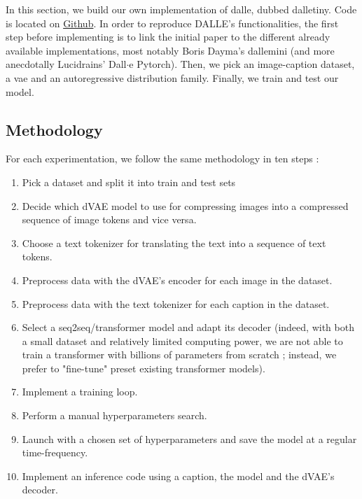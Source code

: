 \documentclass{article}
\begin{document}
\begin{multicols}{2}

In this section, we build our own implementation of \gls{dalle}, dubbed \gls{dalletiny}. Code is located on \href{https://github.com/cthiounn/dalle-tiny}{Github}. In order to reproduce DALLE's functionalities, the first step before implementing is to link the initial paper to the different already available implementations, most notably Boris Dayma's \gls{dallemini} (and more anecdotally Lucidrains' Dall$\cdot$e Pytorch). Then, we pick an image-caption dataset, a \gls{vae} and an autoregressive distribution family. Finally, we train and test our model.

\subsection{Methodology}

For each experimentation, we follow the same methodology in ten steps :

\begin{enumerate}
\item Pick a dataset and split it into train and test sets
    \item Decide which dVAE model to use for compressing images into a compressed sequence of image tokens and vice versa.
    \item Choose a text tokenizer for translating the text into a sequence of text tokens.
    \item Preprocess data with the dVAE's encoder for each image in the dataset.
    \item Preprocess data with the text tokenizer for each caption in the dataset.
    \item Select a seq2seq/transformer model and adapt its decoder (indeed, with both a small dataset and relatively limited computing power, we are not able to train a transformer with billions of parameters from scratch ; instead, we prefer to "fine-tune" preset existing transformer models).
    \item Implement a training loop.
    \item Perform a manual hyperparameters search.
    \item Launch with a chosen set of hyperparameters and save the model at a regular time-frequency.
    \item Implement an inference code using a caption, the model and the dVAE's decoder.
\end{enumerate}


\end{multicols}
\end{document}
